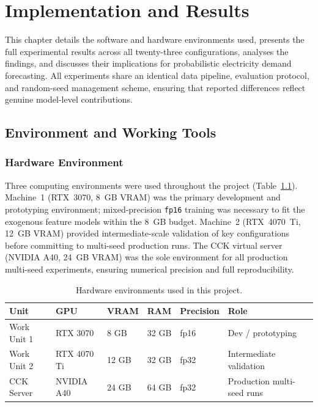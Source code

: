 \chapter{Implementation and Results}
\label{chap:results}

\noindent
This chapter details the software and hardware environments used,
presents the full experimental results across all twenty-three
configurations, analyses the findings, and discusses their implications
for probabilistic electricity demand forecasting.
All experiments share an identical data pipeline, evaluation protocol,
and random-seed management scheme, ensuring that reported differences
reflect genuine model-level contributions.

\section{Environment and Working Tools}
\label{sec:environment}

\subsection{Hardware Environment}
\label{subsec:hardware}

Three computing environments were used throughout the project
(Table~\ref{tab:hardware}).
Machine~1 (RTX~3070, 8~GB VRAM) was the primary development and
prototyping environment; mixed-precision \texttt{fp16} training was
necessary to fit the exogenous feature models within the 8~GB budget.
Machine~2 (RTX~4070~Ti, 12~GB VRAM) provided intermediate-scale validation
of key configurations before committing to multi-seed production runs.
The CCK virtual server (NVIDIA A40, 24~GB VRAM) was the sole environment
for all production multi-seed experiments, ensuring numerical precision
and full reproducibility.

\begin{table}[H]
\centering
\caption{Hardware environments used in this project.}
\label{tab:hardware}
\begin{tabular}{llllll}
\toprule
\textbf{Unit} & \textbf{GPU} & \textbf{VRAM} & \textbf{RAM} &
\textbf{Precision} & \textbf{Role} \\
\midrule
Work Unit 1 & RTX 3070    &  8 GB & 32 GB & fp16 & Dev / prototyping \\
Work Unit 2 & RTX 4070 Ti & 12 GB & 32 GB & fp32 & Intermediate validation \\
CCK Server  & NVIDIA A40  & 24 GB & 64 GB & fp32 & Production multi-seed runs \\
\bottomrule
\end{tabular}
\end{table}

